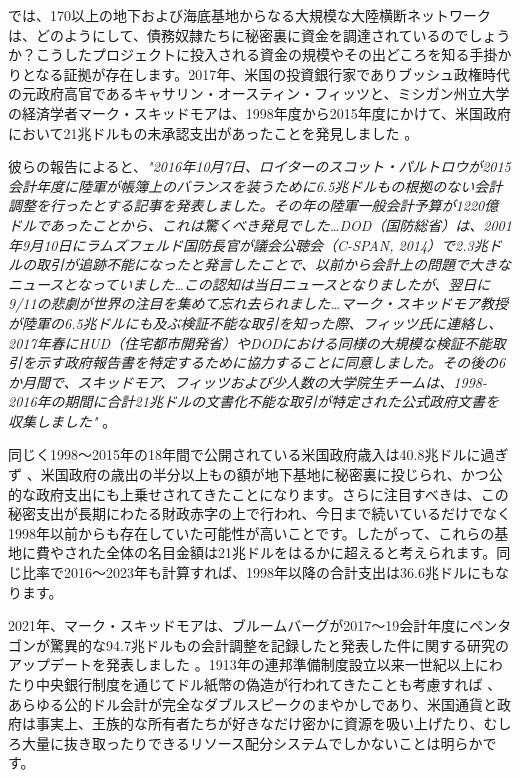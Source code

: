 \documentclass[10pt,twocolumn,letterpaper]{article}
\begin{document}
では、170以上の地下および海底基地からなる大規模な大陸横断ネットワークは、どのようにして、債務奴隷たちに秘密裏に資金を調達されているのでしょうか？こうしたプロジェクトに投入される資金の規模やその出どころを知る手掛かりとなる証拠が存在します。2017年、米国の投資銀行家でありブッシュ政権時代の元政府高官であるキャサリン・オースティン・フィッツと、ミシガン州立大学の経済学者マーク・スキッドモアは、1998年度から2015年度にかけて、米国政府において21兆ドルもの未承認支出があったことを発見しました \cite{11,12,13}。

彼らの報告によると、\textit{"2016年10月7日、ロイターのスコット・パルトロウが2015会計年度に陸軍が帳簿上のバランスを装うために6.5兆ドルもの根拠のない会計調整を行ったとする記事を発表しました。その年の陸軍一般会計予算が1220億ドルであったことから、これは驚くべき発見でした…DOD（国防総省）は、2001年9月10日にラムズフェルド国防長官が議会公聴会（C-SPAN, 2014）で2.3兆ドルの取引が追跡不能になったと発言したことで、以前から会計上の問題で大きなニュースとなっていました…この認知は当日ニュースとなりましたが、翌日に9/11の悲劇が世界の注目を集めて忘れ去られました…マーク・スキッドモア教授が陸軍の6.5兆ドルにも及ぶ検証不能な取引を知った際、フィッツ氏に連絡し、2017年春にHUD（住宅都市開発省）やDODにおける同様の大規模な検証不能取引を示す政府報告書を特定するために協力することに同意しました。その後の6か月間で、スキッドモア、フィッツおよび少人数の大学院生チームは、1998-2016年の期間に合計21兆ドルの文書化不能な取引が特定された公式政府文書を収集しました"} \cite{12}。

同じく1998〜2015年の18年間で公開されている米国政府歳入は40.8兆ドルに過ぎず \cite{15}、米国政府の歳出の半分以上もの額が地下基地に秘密裏に投じられ、かつ公的な政府支出にも上乗せされてきたことになります。さらに注目すべきは、この秘密支出が長期にわたる財政赤字の上で行われ、今日まで続いているだけでなく1998年以前からも存在していた可能性が高いことです。したがって、これらの基地に費やされた全体の名目金額は21兆ドルをはるかに超えると考えられます。同じ比率で2016〜2023年も計算すれば、1998年以降の合計支出は36.6兆ドルにもなります。

2021年、マーク・スキッドモアは、ブルームバーグが2017〜19会計年度にペンタゴンが驚異的な94.7兆ドルもの会計調整を記録したと発表した件に関する研究のアップデートを発表しました \cite{17,18}。1913年の連邦準備制度設立以来一世紀以上にわたり中央銀行制度を通じてドル紙幣の偽造が行われてきたことも考慮すれば \cite{37}、あらゆる公的ドル会計が完全なダブルスピークのまやかしであり、米国通貨と政府は事実上、王族的な所有者たちが好きなだけ密かに資源を吸い上げたり、むしろ大量に抜き取ったりできるリソース配分システムでしかないことは明らかです。
\end{document}
